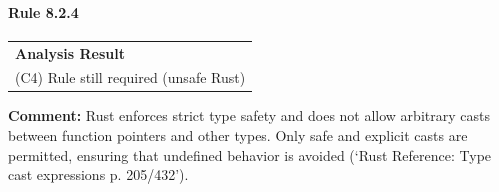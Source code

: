 \paragraph{Rule 8.2.4}
\begin{longtable}{p{13cm}}
\textbf{Analysis Result} \\
(C4) Rule still required (unsafe Rust) \\
\end{longtable}
\textbf{Comment:} Rust enforces strict type safety and does not allow arbitrary casts between function pointers and other types. Only safe and explicit casts are permitted, ensuring that undefined behavior is avoided (`Rust Reference: Type cast expressions p. 205/432'). \\
